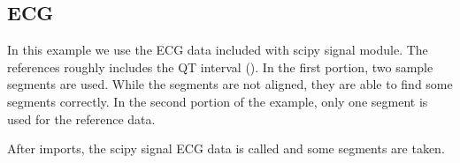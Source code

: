\documentclass[letterpaper,10pt,english]{sphinxmanual}
\begin{document}
\begin{figure}[htbp]
\centering

\noindent{}
\end{figure}


\subsection{ECG}
\label{\detokenize{api_ecg:module-seg1d.examples.ex_ecg}}\label{\detokenize{api_ecg:ecg}}\label{\detokenize{api_ecg::doc}}
\sphinxAtStartPar
In this example we use the ECG data included with scipy signal module. 
The references roughly includes the Q\sphinxhyphen{}T interval ().
In the first portion, two sample segments are used. While the segments are not aligned, they are able to find some segments correctly. 
In the second portion of the example, only one segment is used for the reference data.

\begin{sphinxVerbatim}[commandchars=\\\{\}]
 
   
   
   
  
\end{sphinxVerbatim}

\sphinxAtStartPar
After imports, the scipy signal ECG data is called and some segments are taken.

\begin{sphinxVerbatim}[commandchars=\\\{\}]
   
  \PYG{p}{[}\PYG{p}{[} \PYG{p}{]}\PYG{p}{[} \PYG{p}{]}\PYG{p}{]} 
\end{sphinxVerbatim}
\end{document}
